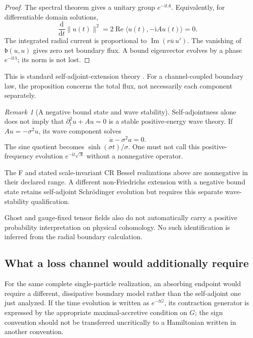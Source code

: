 \documentclass[11pt,a4paper]{article}
\newcommand{\dd}{\mathrm d}
\newcommand{\ii}{\mathrm i}
\newcommand{\norm}[1]{\lVert #1\rVert}
\newcommand{\pair}[2]{\langle #1,#2\rangle}
\theoremstyle{plain}
\theoremstyle{definition}
\theoremstyle{remark}
\newtheorem{remark}[theorem]{Remark}
\numberwithin{equation}{section}
\begin{document}
\begin{proof}
The spectral theorem gives a unitary group \(e^{-\ii tA}\).
Equivalently, for differentiable domain solutions,
\[
\frac{\dd}{\dd t}\norm{u(t)}^2
 =2\operatorname{Re}\pair{u(t)}{-\ii Au(t)}=0.
\]
The integrated radial current is proportional to
\(\operatorname{Im}(r\overline u\,u')\).
The vanishing of \(\mathfrak b(u,u)\) gives zero net boundary
flux. A bound eigenvector evolves by a phase
\(e^{-\ii t\lambda}\); its norm is not lost.
\end{proof}

This is standard self-adjoint-extension theory
\cite{KayStuder,DerezinskiRichard}.
For a channel-coupled boundary law, the proposition concerns the
total flux, not necessarily each component separately.

\begin{remark}[A negative bound state and wave stability]
Self-adjointness alone does not imply that
\(\partial_t^2u+Au=0\) is a stable positive-energy wave theory.
If \(Au=-\sigma^2u\), its wave component solves
\[
\ddot a-\sigma^2a=0.
\]
The sine quotient becomes \(\sinh(\sigma t)/\sigma\).
One must not call this positive-frequency evolution
\(e^{-\ii t\sqrt A}\) without a nonnegative operator.

The F and stated scale-invariant CR Bessel realizations above
are nonnegative in their declared range.
A different non-Friedrichs extension with a negative bound state
retains self-adjoint Schr\"odinger evolution but requires this
separate wave-stability qualification.
\end{remark}

Ghost and gauge-fixed tensor fields also do not automatically
carry a positive probability interpretation on physical
cohomology. No such identification is inferred from the radial
boundary calculation.

\subsection{What a loss channel would additionally require}

For the same complete single-particle realization, an absorbing
endpoint would require a different, dissipative boundary model
rather than the self-adjoint one just analyzed.
If the time evolution is written as \(e^{-tG}\), its contraction
generator is expressed by the appropriate maximal-accretive
condition on \(G\); the sign convention should not be transferred
uncritically to a Hamiltonian written in another convention.
\end{document}
